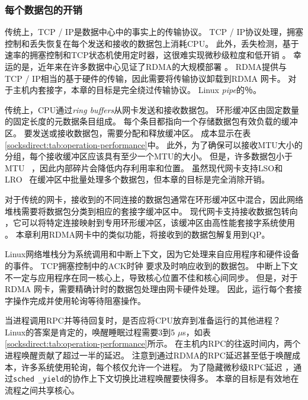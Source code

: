 \subsubsection{每个数据包的开销}
\label{socksdirect:subsec:per-packet-overhead}

传统上，TCP / IP是数据中心中的事实上的传输协议。
TCP / IP协议处理，拥塞控制和丢失恢复在每个发送和接收的数据包上消耗CPU。
此外，丢失检测，基于速率的拥塞控制和TCP状态机使用定时器，这很难实现微秒级粒度和低开销 \cite{jeong2014mtcp}。
幸运的是，近年来在许多数据中心见证了RDMA的大规模部署 \cite {guo2016rdma,zhu2015congestion,mittal2015timely}。
RDMA提供与TCP / IP相当的基于硬件的传输，因此需要将传输协议卸载到RDMA 网卡。
对于主机内套接字，本章的目标是完全绕过传输协议。 Linux \emph {pipe}的％。

传统上，CPU通过\emph {ring buffers}从网卡发送和接收数据包。
环形缓冲区由固定数量的固定长度的元数据条目组成。
每个条目都指向一个存储数据包有效负载的缓冲区。
要发送或接收数据包，需要分配和释放缓冲区。
成本显示在表 \ref {socksdirect:tab:operation-performance}中。
此外，为了确保可以接收MTU大小的分组，每个接收缓冲区应该具有至少一个MTU的大小。
但是，许多数据包小于MTU~ \cite {thompson1997wide}，因此内部碎片会降低内存利用率和位置。
虽然现代网卡支持LSO和LRO~ \cite {lsolro}在缓冲区中批量处理多个数据包，但本章的目标是完全消除开销。

对于传统的网卡，接收到的不同连接的数据包通常在环形缓冲区中混合，因此网络堆栈需要将数据包分类到相应的套接字缓冲区中。
现代网卡支持接收数据包转向 \cite {mellanox}，它可以将特定连接映射到专用环形缓冲区，该缓冲区由高性能套接字系统使用 \cite {jeong2014mtcp,lin2016scalable,libvma}。
本章利用RDMA网卡中的类似功能，将接收到的数据包解复用到QP。

Linux网络堆栈分为系统调用和中断上下文，因为它处理来自应用程序和硬件设备的事件。
TCP拥塞控制中的ACK时钟 \cite {mprdma}要求及时响应收到的数据包。
中断上下文不一定与应用程序在同一核心上，导致核心位置不佳和核心间同步。
但是，对于RDMA 网卡，需要精确计时的数据包处理由网卡硬件处理。
因此，\libipc {}运行每个套接字操作完成并使用轮询等待阻塞操作。



当进程调用RPC并等待回复时，是否应将CPU放弃到准备运行的其他进程？
Linux的答案是肯定的，唤醒睡眠过程需要3到5 $\mu$s，如表 \ref {socksdirect:tab:operation-performance}所示。
在主机内RPC的往返时间内，两个进程唤醒贡献了超过一半的延迟。
注意到通过RDMA的RPC延迟甚至低于唤醒成本，许多系统使用轮询，每个核仅允许一个进程。
为了隐藏微秒级RPC延迟 \cite {barroso2017attack}，通过\texttt {sched \_yield}的协作上下文切换比进程唤醒要快得多。
本章的目标是有效地在流程之间共享核心。

